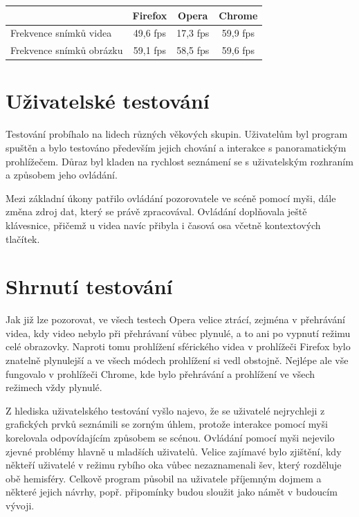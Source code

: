 \begin{center}
	\begin{tabular}{ l | c| c| c  } 
		& \textbf{Firefox} & \textbf{Opera}  & \textbf{Chrome}   \\ 
		\hline
		Frekvence snímků videa & 49,6 fps & 17,3 fps & 59,9 fps    \\ 
		\hline
		Frekvence snímků obrázku & 59,1 fps & 58,5 fps & 59,6 fps    \\ 
		
	\end{tabular}
\end{center}

\section*{Uživatelské testování}
Testování probíhalo na lidech různých věkových skupin. Uživatelům byl program spuštěn a bylo testováno především jejich chování a interakce s panoramatickým prohlížečem. Důraz byl kladen na rychlost seznámení se s uživatelským rozhraním a způsobem jeho ovládání.

Mezi základní úkony patřilo ovládání pozorovatele ve scéně pomocí myši, dále změna zdroj dat, který se právě zpracovával. Ovládání doplňovala ještě klávesnice, přičemž  u videa navíc přibyla i časová osa včetně kontextových tlačítek. 


\section*{Shrnutí testování}
Jak již lze pozorovat, ve všech testech Opera velice ztrácí, zejména v přehrávání videa, kdy video nebylo při přehrávaní vůbec plynulé, a to ani po vypnutí režimu celé obrazovky. Naproti tomu prohlížení sférického videa v prohlížeči Firefox bylo znatelně plynulejší a ve všech módech prohlížení si vedl obstojně. Nejlépe ale vše fungovalo v prohlížeči Chrome, kde bylo přehrávání a prohlížení ve všech režimech vždy plynulé. 

Z hlediska uživatelského testování vyšlo najevo, že se uživatelé nejrychleji z grafických prvků seznámili se zorným úhlem, protože interakce pomocí myši korelovala odpovídajícím způsobem se scénou. Ovládání pomocí myši nejevilo zjevné problémy hlavně u mladších uživatelů. Velice zajímavé bylo zjištění, kdy někteří uživatelé v režimu rybího oka vůbec nezaznamenali šev, který rozděluje obě hemisféry. Celkově program působil na uživatele příjemným dojmem a některé jejich návrhy, popř. připomínky budou sloužit jako námět v budoucím vývoji. 
 
